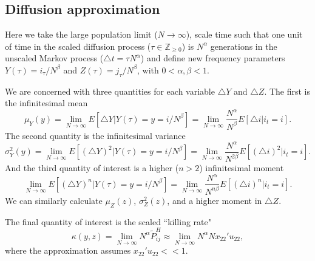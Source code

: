 \documentclass[review,3p,authoryear]{elsarticle}
\begin{document}
\begin{appendices}
\section{Diffusion approximation}
\label{App:Diffusion}
\renewcommand{\theequation}{B\arabic{equation}}
\setcounter{equation}{0} 

Here we take the large population limit ($N \rightarrow \infty$), scale time such that one unit of time in the scaled diffusion process ($\tau \in \mathbb{Z}_{\geq 0}$) is $N^\alpha$ generations in the unscaled Markov process ($\triangle t =  \tau N^\alpha$) and define new frequency parameters $Y(\tau) = i_\tau / N^\beta$ and $Z(\tau) = j_\tau / N^\beta$, with $0<\alpha,\beta<1$.

We are concerned with three quantities for each variable $\triangle Y$ and $\triangle Z$.
The first is the infinitesimal mean
\begin{equation}
\mu_Y(y) = \lim_{N\rightarrow\infty} E[ \triangle Y | Y(\tau) = y = i/N^\beta ] = \lim_{N\rightarrow\infty} \frac{N^\alpha}{N^\beta} E[ \triangle i | i_t = i ].
\end{equation}
The second quantity is the infinitesimal variance
\begin{equation}
\sigma^2_Y(y) = \lim_{N\rightarrow\infty} E[ (\triangle Y)^2 | Y(\tau) = y = i/N^\beta ] = \lim_{N\rightarrow\infty} \frac{N^\alpha}{N^{2\beta}} E[ (\triangle i)^2 | i_t = i ].
\end{equation}
And the third quantity of interest is a higher ($n>2$) infinitesimal moment 
\begin{equation}
\lim_{N\rightarrow\infty} E[ (\triangle Y)^n | Y(\tau) = y = i/N^\beta ] = \lim_{N\rightarrow\infty} \frac{N^\alpha}{N^{n\beta}} E[ (\triangle i)^n | i_t = i ].
\end{equation}
We can similarly calculate $\mu_Z(z)$, $\sigma^2_Z(z)$, and a higher moment in $\triangle Z$.

The final quantity of interest is the scaled ``killing rate"
\begin{equation}\label{kyz}
\kappa(y,z) = \lim_{N\rightarrow\infty} N^\alpha \tilde{P}_{ij}^H \approx \lim_{N\rightarrow\infty} N^\alpha Nx_{22}'u_{22},
\end{equation}
where the approximation assumes $x_{22}'u_{22}<<1$.


\end{appendices}
\end{document}
